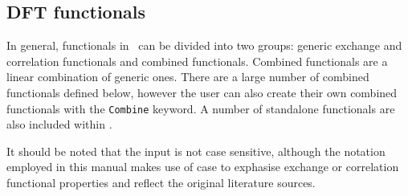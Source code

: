 \subsection{\label{ref-dft}DFT functionals}

In general, functionals in \dalton\ can be divided into two groups: 
generic exchange and correlation functionals 
and combined functionals. Combined functionals are a linear combination of
generic ones. There are a large number of combined functionals defined below, 
however the user can also create their own combined functionals with 
the \verb|Combine| keyword. 
A number of standalone functionals are also included within \dalton. 

It should be noted that the input is not case sensitive, although the notation
employed in this manual makes use of case to exphasise exchange or correlation 
functional properties and reflect the original literature sources.


